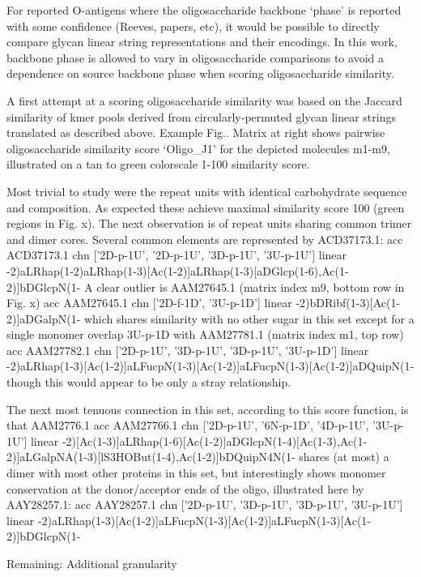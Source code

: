 \documentclass{article}
\begin{document}
For reported O-antigens where the oligosaccharide backbone ‘phase’ is reported with some confidence (Reeves, papers, etc), it would be possible to directly compare glycan linear string representations and their encodings. In this work, backbone phase is allowed to vary in oligosaccharide comparisons to avoid a dependence on  source backbone phase when scoring oligosaccharide similarity.

A first attempt at a scoring oligosaccharide similarity was based on the Jaccard similarity of kmer pools derived from circularly-permuted glycan linear strings translated as described above.
Example Fig.. Matrix at right shows pairwise oligosaccharide similarity score ‘Oligo\_J1’ for the depicted molecules m1-m9, illustrated on a tan to green colorscale 1-100 similarity score.

Most trivial to study were the repeat units with identical carbohydrate sequence and composition. As expected these achieve maximal similarity score 100 (green regions in Fig. x). The next observation is of repeat units sharing common trimer and dimer cores. Several common elements are represented by ACD37173.1:
acc ACD37173.1
chn ['2D-p-1U', '2D-p-1U', '3D-p-1U', '3U-p-1U']
linear -2)aLRhap(1-2)aLRhap(1-3)[Ac(1-2)]aLRhap(1-3)[aDGlcp(1-6),Ac(1-2)]bDGlcpN(1-
A clear outlier is AAM27645.1 (matrix index m9, bottom row in Fig. x)
acc AAM27645.1
chn ['2D-f-1D', '3U-p-1D']
linear -2)bDRibf(1-3)[Ac(1-2)]aDGalpN(1-
which shares similarity with no other sugar in this set except for a single monomer overlap 3U-p-1D with AAM27781.1 (matrix index m1, top row)
acc AAM27782.1
chn ['2D-p-1U', '3D-p-1U', '3D-p-1U', '3U-p-1D']
linear -2)aLRhap(1-3)[Ac(1-2)]aLFucpN(1-3)[Ac(1-2)]aLFucpN(1-3)[Ac(1-2)]aDQuipN(1-
though this would appear to be only a stray relationship.

The next most tenuous connection in this set, according to this score function, is that AAM2776.1
acc AAM27766.1
chn ['2D-p-1U', '6N-p-1D', '4D-p-1U', '3U-p-1U']
linear -2)[Ac(1-3)]aLRhap(1-6)[Ac(1-2)]aDGlcpN(1-4)[Ac(1-3),Ac(1-2)]aLGalpNA(1-3)[lS3HOBut(1-4),Ac(1-2)]bDQuipN4N(1-
shares (at most) a dimer with most other proteins in this set, but interestingly shows monomer conservation at the donor/acceptor ends of the oligo, illustrated here by AAY28257.1:
acc AAY28257.1
chn ['2D-p-1U', '3D-p-1U', '3D-p-1U', '3U-p-1U']
linear -2)aLRhap(1-3)[Ac(1-2)]aLFucpN(1-3)[Ac(1-2)]aLFucpN(1-3)[Ac(1-2)]bDGlcpN(1-

Remaining: Additional granularity
\end{document}
